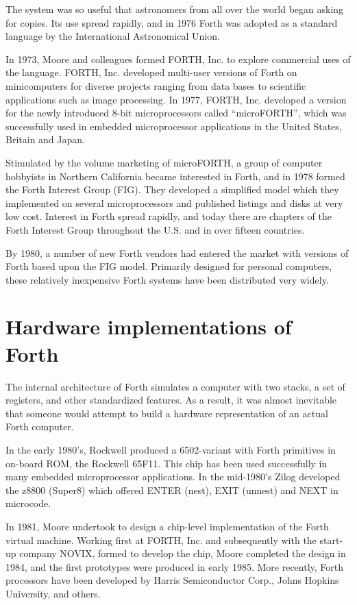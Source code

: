 The system was so useful that astronomers from all over the world
began asking for copies. Its use spread rapidly, and in 1976 Forth
was adopted as a standard language by the International Astronomical
Union.

In 1973, Moore and colleagues formed FORTH, Inc. to explore
commercial uses of the language. FORTH, Inc. developed multi-user
versions of Forth on minicomputers for diverse projects ranging from
data bases to scientific applications such as image processing.
In 1977, FORTH, Inc. developed a version for the newly introduced
8-bit microprocessors called ``microFORTH'', which was successfully
used in embedded microprocessor applications in the United States,
Britain and Japan.

Stimulated by the volume marketing of microFORTH, a group of
computer hobbyists in Northern Cal\-i\-for\-nia became interested in Forth,
and in 1978 formed the Forth Interest Group (FIG). They developed a
simplified model which they implemented on several microprocessors
and published listings and disks at very low cost. Interest in Forth
spread rapidly, and today there are chapters of the Forth Interest
Group throughout the U.S. and in over fifteen countries.

By 1980, a number of new Forth vendors had entered the market with
versions of Forth based upon the FIG model. Primarily designed for
personal computers, these relatively inexpensive Forth systems have
been distributed very widely.


\section{Hardware implementations of Forth} %

The internal architecture of Forth simulates a computer with two
stacks, a set of registers, and other standardized features. As a
result, it was almost inevitable that someone would attempt to build
a hardware representation of an actual Forth computer.

In the early 1980's, Rockwell produced a 6502-variant with Forth
primitives in on-board ROM, the \linebreak Rockwell 65F11. This chip has been
used successfully in many embedded microprocessor applications. In
the mid-1980's Zilog developed the z8800 (Super8) which offered
ENTER (nest), EXIT (unnest) and NEXT in microcode.

In 1981, Moore undertook to design a chip-level implementation of
the Forth virtual machine. Working first at FORTH, Inc. and
subsequently with the start-up company NOVIX, formed to develop the
chip, Moore completed the design in 1984, and the first prototypes
were produced in early 1985. More recently, Forth processors have
been developed by Harris Semiconductor Corp., Johns Hopkins
University, and others.


